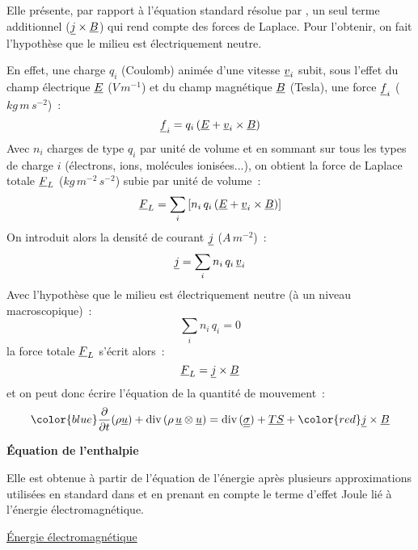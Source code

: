 Elle présente, par rapport à
l'équation standard résolue par \CS, un seul terme additionnel
($\underline{j} \times \underline{B}$) qui rend compte des forces de Laplace.
Pour l'obtenir, on fait l'hypothèse que le milieu est
électriquement neutre.

En effet, une charge $q_i$ (Coulomb) animée d'une
vitesse $\underline{v}_i$ subit,
sous l'effet du champ électrique $\underline{E}$ ($V\,m^{-1}$) et du champ magnétique
$\underline{B}$ (Tesla),  une force $\underline{f}_i$ ($kg\,m\,s^{-2}$)~:
\begin{equation}
\underline{f}_i=q_i\left(\underline{E} + \underline{v}_i \times \underline{B}\right)
\end{equation}
Avec $n_i$ charges de type $q_i$ par unité de volume et en sommant sur tous
les types de charge $i$ (électrons, ions, molécules ionisées...), on
obtient la force de Laplace totale $\underline{F}_L$ ($kg\,m^{-2}\,s^{-2}$) subie par unité de
volume~:
\begin{equation}
\underline{F}_L=\sum\limits_i\left[{n_i\,q_i\left(\underline{E} + \underline{v}_i \times \underline{B}\right)}\right]
\end{equation}
On introduit alors la densité de courant $\underline{j}$ ($A\,m^{-2}$)~:
\begin{equation}
\underline{j}=\sum\limits_i n_i\,q_i\,\underline{v}_i
\end{equation}
Avec l'hypothèse que le milieu est électriquement neutre (à un
niveau macroscopique)~:
\begin{equation}
\sum\limits_i n_i\,q_i = 0
\end{equation}
la force totale $\underline{F}_L$ s'écrit alors~:
\begin{equation}
\underline{F}_L=\underline{j} \times \underline{B}
\end{equation}
et on peut donc écrire l'équation de la quantité de mouvement~:
\begin{equation}
\displaystyle{\color{blue}\frac{\partial}{\partial t}(\rho \vect{u})
+\dive(\rho\, \vect{u} \otimes \vect{u})
=\dive(\tens{\sigma}) + \vect{TS} + {\color{red}\vect{j} \times \vect{B}}}
\end{equation}

\vspace*{0,5cm}
{\bf Équation de l'enthalpie}
\nopagebreak

Elle est obtenue à partir de l'équation de
l'énergie après plusieurs approximations utilisées en standard dans \CS et en
prenant en compte le terme d'effet Joule lié à l'énergie
électromagnétique.

\underline{Énergie électromagnétique}
\nopagebreak

